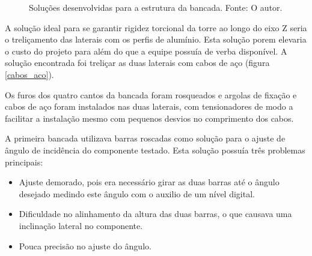 \begin{figure}[!ht]
    \centering
    \caption{Soluções desenvolvidas para a estrutura da bancada. Fonte: O autor.}
        \label{cabos_aco}
        \qquad
        \label{reforco_estrutural}
\end{figure}

A solução ideal para se garantir rigidez torcional da torre ao longo do eixo Z seria o treliçamento das laterais com os perfis de alumínio. Esta solução porem elevaria o custo do projeto para além do que a equipe possuía de verba disponível. A solução encontrada foi treliçar as duas laterais com cabos de aço (figura \ref{cabos_aco}).

Os furos dos quatro cantos da bancada foram rosqueados e argolas de fixação e cabos de aço foram instalados nas duas laterais, com tensionadores de modo a facilitar a instalação mesmo com pequenos desvios no comprimento dos cabos.

A primeira bancada utilizava barras roscadas como solução para o ajuste de ângulo de incidência do componente testado. Esta solução possuía três problemas principais:

\begin{itemize}
    \item Ajuste demorado, pois era necessário girar as duas barras até o ângulo desejado medindo este ângulo com o auxilio de um nível digital.
    \item Dificuldade no alinhamento da altura das duas barras, o que causava uma inclinação lateral no componente.
    \item Pouca precisão no ajuste do ângulo.
\end{itemize}

